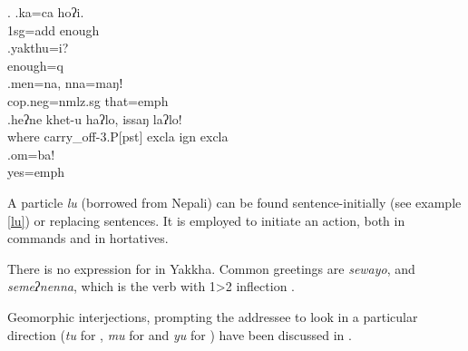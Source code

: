  \ex. \ag.ka=ca hoʔi.\\
 {\sc 1sg=add} enough\\
 \bg.yakthu=i?\\
 enough{\sc =q}\\
 \bg.men=na, nna=maŋǃ\\
 {\sc cop.neg=nmlz.sg} that{\sc =emph}\\
 \bg.heʔne khet-u haʔlo,                 issaŋ       laʔlo!\\
 where carry\_off{\sc -3.P[pst]}  {\sc excla} {\sc ign} {\sc excla}\\
  
 \bg.om=ba!\\
 yes{\sc =emph}\\
 
 
 
A particle \emph{lu} (borrowed from Nepali) can be  found sentence-initially (see example \ref{lu}) or replacing sentences. It is employed to initiate an action, both in commands and in hortatives.

 There is no expression for  in Yakkha. Common greetings are \emph{sewayo}, and \emph{semeʔnenna}, which is the verb  with 1>2 inflection . 

Geomorphic interjections, prompting the addressee to look in a particular direction (\emph{tu} for , \emph{mu} for  and \emph{yu} for ) have been  discussed in .  
  

  
 

